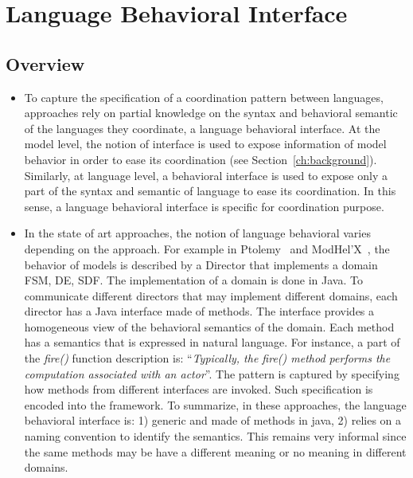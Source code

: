 \section{Language Behavioral Interface}
	\subsection{Overview}
	\begin{itemize}
		\item To capture the specification of a coordination pattern between languages, approaches rely on partial knowledge on the syntax and behavioral semantic of the languages they coordinate, \ie a language behavioral interface. At the model level, the notion of interface is used to expose information of model behavior in order to ease its coordination (see Section~\ref{ch:background}). Similarly, at language level, a behavioral interface is used to expose only a part of the syntax and semantic of language to ease its coordination. In this sense, a language behavioral interface is specific for coordination purpose.   
		
		\item In the state of art approaches, the notion of language behavioral varies depending on the approach. For example in Ptolemy~\cite{ptoleframebib} and ModHel'X~\cite{modhelxbib}, the behavior of models is described by a Director that implements a domain \eg FSM, DE, SDF. The implementation of a domain is done in Java. To communicate different directors that may implement different domains, each director has a Java interface made of methods. The interface provides a homogeneous view of the behavioral semantics of the domain. Each method has a semantics that is expressed in natural language. For instance, a part of the \emph{fire()} function description is: ``\emph{Typically, the fire() method performs the computation associated with an actor}''. The pattern is captured by specifying how methods from different interfaces are invoked. Such specification is encoded into the framework. To summarize, in these approaches, the language behavioral interface is: 1) generic and made of methods in java, 2) relies on a naming convention to identify the semantics. This remains very informal since the same methods may be have a different meaning or no meaning in different domains.    
		

\end{itemize}
